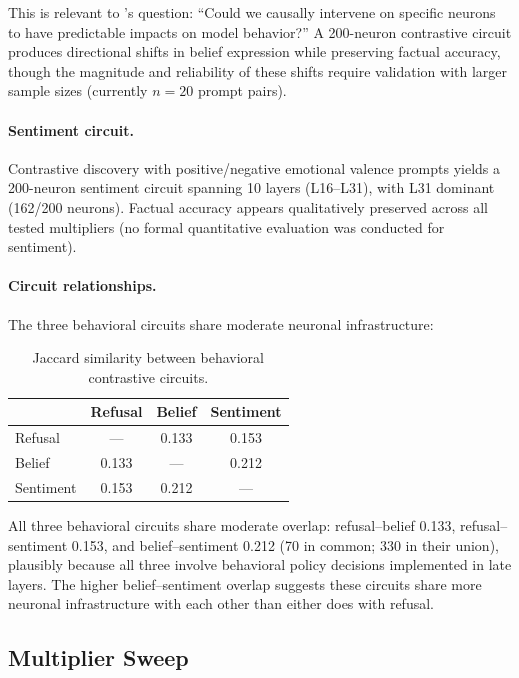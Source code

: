 \documentclass[11pt]{article}
\begin{document}
This is relevant to \citet{chalnick2025goodfire}'s question: ``Could we causally intervene on specific neurons to have predictable impacts on model behavior?''
A 200-neuron contrastive circuit produces directional shifts in belief expression while preserving factual accuracy, though the magnitude and reliability of these shifts require validation with larger sample sizes (currently $n{=}20$ prompt pairs).

\paragraph{Sentiment circuit.}
Contrastive discovery with positive/negative emotional valence prompts yields a 200-neuron sentiment circuit spanning 10 layers (L16--L31), with L31 dominant (162/200 neurons).
Factual accuracy appears qualitatively preserved across all tested multipliers (no formal quantitative evaluation was conducted for sentiment).

\paragraph{Circuit relationships.}
The three behavioral circuits share moderate neuronal infrastructure:

\begin{table}[htbp]
\centering
\caption{Jaccard similarity between behavioral contrastive circuits.}
\label{tab:behavioral_overlap}
\small
\begin{tabular}{lccc}
\toprule
& \textbf{Refusal} & \textbf{Belief} & \textbf{Sentiment} \\
\midrule
Refusal & --- & 0.133 & 0.153 \\
Belief & 0.133 & --- & 0.212 \\
Sentiment & 0.153 & 0.212 & --- \\
\bottomrule
\end{tabular}
\end{table}

All three behavioral circuits share moderate overlap: refusal--belief 0.133, refusal--sentiment 0.153, and belief--sentiment 0.212 (70 in common; 330 in their union), plausibly because all three involve behavioral policy decisions implemented in late layers.
The higher belief--sentiment overlap suggests these circuits share more neuronal infrastructure with each other than either does with refusal.

\subsection{Multiplier Sweep}
\label{sec:sweep}
\end{document}
